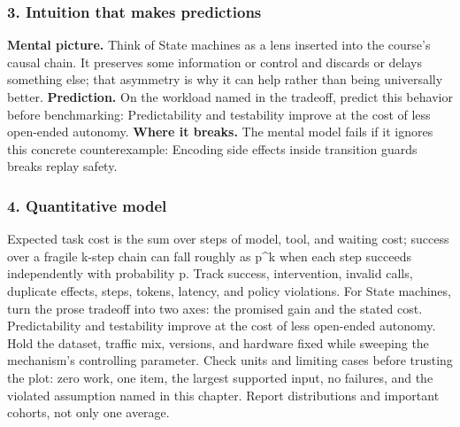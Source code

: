 \subsubsection*{3. Intuition that makes predictions}
\textbf{Mental picture.} Think of State machines as a lens inserted into the course's causal chain. It preserves some information or control and discards or delays something else; that asymmetry is why it can help rather than being universally better.
\textbf{Prediction.} On the workload named in the tradeoff, predict this behavior before benchmarking: Predictability and testability improve at the cost of less open-ended autonomy.
\textbf{Where it breaks.} The mental model fails if it ignores this concrete counterexample: Encoding side effects inside transition guards breaks replay safety.
\subsubsection*{4. Quantitative model}
Expected task cost is the sum over steps of model, tool, and waiting cost; success over a fragile k-step chain can fall roughly as p\textasciicircum{}k when each step succeeds independently with probability p. Track success, intervention, invalid calls, duplicate effects, steps, tokens, latency, and policy violations.
For State machines, turn the prose tradeoff into two axes: the promised gain and the stated cost. Predictability and testability improve at the cost of less open-ended autonomy. Hold the dataset, traffic mix, versions, and hardware fixed while sweeping the mechanism's controlling parameter.
Check units and limiting cases before trusting the plot: zero work, one item, the largest supported input, no failures, and the violated assumption named in this chapter. Report distributions and important cohorts, not only one average.
